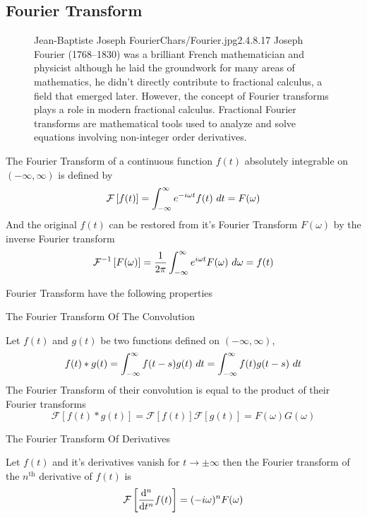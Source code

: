 \subsection{Fourier Transform}
\begin{figure*}[b]
    \begin{minipage}[h]{\textwidth}
        \begin{enrichment}{Jean-Baptiste Joseph Fourier}{Chars/Fourier.jpg}{2.4}{.8}{.17}
            Joseph Fourier (1768–1830) was a brilliant French mathematician and physicist
            although he laid the groundwork for many areas of mathematics, he didn't directly contribute to fractional calculus, 
            a field that emerged later. However, the concept of Fourier transforms  plays a role in modern fractional calculus. 
            Fractional Fourier transforms are mathematical tools used to analyze and solve equations involving non-integer order 
            derivatives.
        \end{enrichment} 
    \end{minipage}
\end{figure*}
The Fourier Transform of a continuous function $f(t)$ absolutely integrable 
on $(-\infty,\infty)$ is defined by
\[
    \mathcal{F}\left[ f(t) \right] = \int_{-\infty}^{\infty} e^{-i\omega t} f(t) \,\, dt = F(\omega)
\]
And the original $f(t)$ can be restored from it's Fourier Transform $F(\omega)$
by the inverse Fourier transform
\[
    \mathcal{F}^{-1}\left[ F(\omega) \right] = \frac{1}{2\pi} \int_{-\infty}^{\infty} e^{i\omega t} F(\omega) \,\, d\omega = f(t)
\]

Fourier Transform have the following properties
\setcounter{property}{0}
\begin{property}
    The Fourier Transform Of The Convolution 

    Let $f(t)$ and $g(t)$ be two functions defined on $(-\infty,\infty)$,
\[
    f(t)*g(t) = \int_{-\infty}^{\infty} f(t-s)g(t) \,\, dt = \int_{-\infty}^{\infty} f(t)g(t-s) \,\, dt    
\]
The Fourier Transform of their convolution is equal to the product of their Fourier transforms
\begin{equation}
    \mathcal{F}\left[ f(t)*g(t) \right] = \mathcal{F}\left[ f(t) \right] \mathcal{F}\left[ g(t) \right] = F(\omega)G(\omega)
\end{equation}
\end{property}
\begin{property}
The Fourier Transform Of Derivatives

Let $f(t)$ and it's derivatives vanish for $t\to \pm\infty$ then 
the Fourier transform of the $ n^{\text{th}} $ derivative of $f(t)$ is
\begin{equation}
    \mathcal{F} \left[ \dv[n]{}{t}f(t) \right] = (-i\omega)^n F(\omega)
\end{equation}
\end{property}
